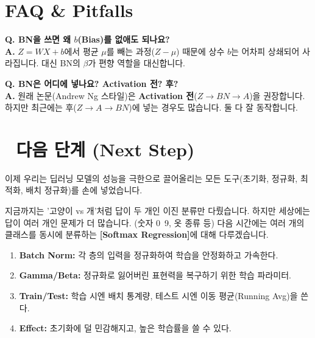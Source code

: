\documentclass[11pt,a4paper]{book}
\theoremstyle{definition}
\begin{document}
\section{FAQ \& Pitfalls}

\textbf{Q. BN을 쓰면 왜 $b$(Bias)를 없애도 되나요?} \\
\textbf{A.} $Z = WX + b$에서 평균 $\mu$를 빼는 과정($Z - \mu$) 때문에 상수 $b$는 어차피 상쇄되어 사라집니다. 대신 BN의 $\beta$가 편향 역할을 대신합니다.

\textbf{Q. BN은 어디에 넣나요? Activation 전? 후?} \\
\textbf{A.} 원래 논문(Andrew Ng 스타일)은 \textbf{Activation 전}($Z \to BN \to A$)을 권장합니다. 하지만 최근에는 후($Z \to A \to BN$)에 넣는 경우도 많습니다. 둘 다 잘 동작합니다.

\section*{🔗 다음 단계 (Next Step)}
이제 우리는 딥러닝 모델의 성능을 극한으로 끌어올리는 모든 도구(초기화, 정규화, 최적화, 배치 정규화)를 손에 넣었습니다.

지금까지는 '고양이 vs 개'처럼 답이 두 개인 이진 분류만 다뤘습니다. 하지만 세상에는 답이 여러 개인 문제가 더 많습니다. (숫자 0~9, 옷 종류 등)
다음 시간에는 여러 개의 클래스를 동시에 분류하는 \textbf{[Softmax Regression]}에 대해 다루겠습니다.

\vspace{0.5cm}

\begin{summarybox}[title={단원 요약 (Cheat Sheet)}]
\begin{enumerate}
    \item \textbf{Batch Norm:} 각 층의 입력을 정규화하여 학습을 안정화하고 가속한다.
    \item \textbf{Gamma/Beta:} 정규화로 잃어버린 표현력을 복구하기 위한 학습 파라미터.
    \item \textbf{Train/Test:} 학습 시엔 배치 통계량, 테스트 시엔 이동 평균(Running Avg)을 쓴다.
    \item \textbf{Effect:} 초기화에 덜 민감해지고, 높은 학습률을 쓸 수 있다.
\end{enumerate}
\end{summarybox}


\end{document}
